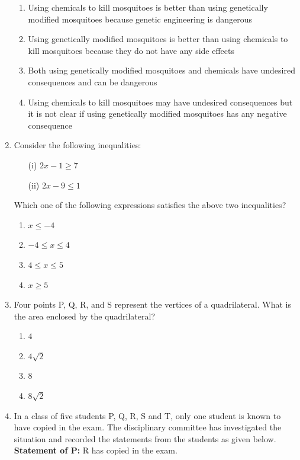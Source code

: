 \documentclass[journal,12pt,onecolumn]{IEEEtran}
\theoremstyle{remark}
\begin{document}
\begin{enumerate}
\hfill{}
\begin{enumerate}
\item Using chemicals to kill mosquitoes is better than using genetically modified mosquitoes because genetic engineering is dangerous 
\item Using genetically modified mosquitoes is better than using chemicals to kill mosquitoes because they do not have any side effects 
\item Both using genetically modified mosquitoes and chemicals have undesired consequences and can be dangerous 
\item Using chemicals to kill mosquitoes may have undesired consequences but it is not clear if using genetically modified mosquitoes has any negative
consequence 
\end{enumerate}

\item  Consider the following inequalities:  

\begin{enumerate}
    \item[(i)] $2x - 1 \geq 7$
    \item[(ii)] $2x - 9 \leq 1$
\end{enumerate}

Which one of the following expressions satisfies the above two inequalities?    

\hfill{}
\begin{multicols}{4}
\begin{enumerate}
\item $x \leq -4$
\item $-4 \leq x \leq 4$ 
\item $4 \leq x \leq 5$
\item $x \geq 5$
\end{enumerate}
\end{multicols}
\item Four points P, Q, R, and S represent the vertices
of a quadrilateral.
What is the area enclosed by the quadrilateral? 

\hfill{}
\begin{multicols}{4}
\begin{enumerate}
\item $4$
\item $4\sqrt{2}$ 
\item $8$
\item $8\sqrt{2}$
\end{enumerate}
\end{multicols}
\item In a class of five students P, Q, R, S and T, only one student is known to have copied in the exam. The disciplinary committee has investigated the situation
and recorded the statements from the students as given below. 
\textbf{Statement of P:} R has copied in the exam.  


\end{enumerate}
\end{document}
